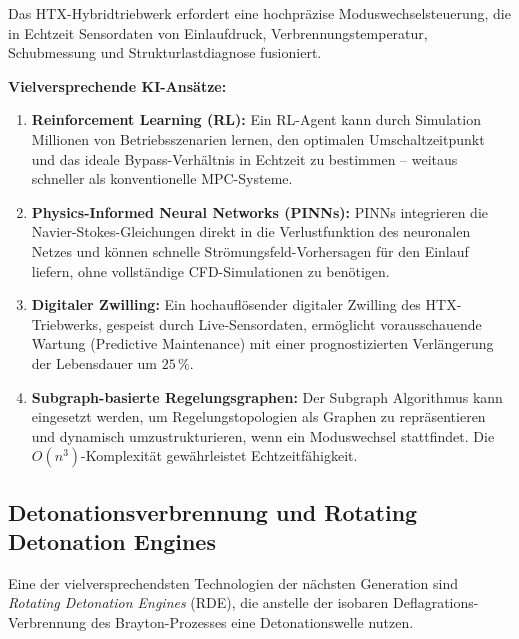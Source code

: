 ﻿\documentclass[12pt,a4paper]{article}
\theoremstyle{remark}
\begin{document}
Das HTX-Hybridtriebwerk erfordert eine hochpr\"azise Moduswechselsteuerung,
die in Echtzeit Sensordaten von Einlaufdruck, Verbrennungstemperatur,
Schubmessung und Strukturlastdiagnose fusioniert.

\textbf{Vielversprechende KI-Ans\"atze:}
\begin{enumerate}[label=(\alph*)]
  \item \textbf{Reinforcement Learning (RL):} Ein RL-Agent kann durch
        Simulation Millionen von Betriebsszenarien lernen, den optimalen
        Umschaltzeitpunkt und das ideale Bypass-Verh\"altnis in Echtzeit
        zu bestimmen -- weitaus schneller als konventionelle MPC-Systeme.

  \item \textbf{Physics-Informed Neural Networks (PINNs):} PINNs integrieren
        die Navier-Stokes-Gleichungen direkt in die Verlustfunktion des
        neuronalen Netzes und k\"onnen schnelle Str\"omungsfeld-Vorhersagen
        f\"ur den Einlauf liefern, ohne vollst\"andige CFD-Simulationen zu
        ben\"otigen.

  \item \textbf{Digitaler Zwilling:} Ein hochaufl\"osender digitaler Zwilling
        des HTX-Triebwerks, gespeist durch Live-Sensordaten, erm\"oglicht
        vorausschauende Wartung (Predictive Maintenance) mit einer
        prognostizierten Verl\"angerung der Lebensdauer um $25\,\%$.

  \item \textbf{Subgraph-basierte Regelungsgraphen:} Der Subgraph Algorithmus
        \cite{epp2026subgraph} kann eingesetzt werden, um Regelungstopologien
        als Graphen zu repr\"asentieren und dynamisch umzustrukturieren,
        wenn ein Moduswechsel stattfindet.
        Die $O(n^3)$-Komplexit\"at gew\"ahrleistet Echtzeitf\"ahigkeit.
\end{enumerate}

\subsection{Detonationsverbrennung und Rotating Detonation Engines}

Eine der vielversprechendsten Technologien der n\"achsten Generation sind
\emph{Rotating Detonation Engines} (RDE), die anstelle der isobaren
Deflagrations-Verbrennung des Brayton-Prozesses eine
Detonationswelle nutzen.
\end{document}
